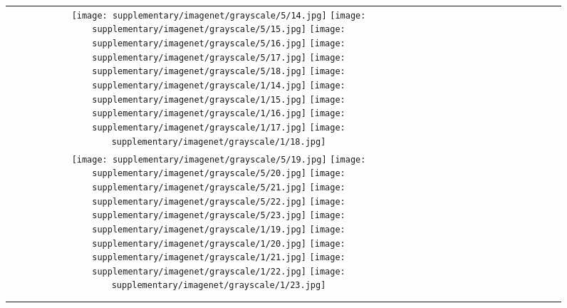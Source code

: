 \begin{figure*}[tb!]
{\begin{tabular}{c c c c c c c c c c c c c c }
\tabularnewline
  \texttt{[image: supplementary/imagenet/grayscale/5/14.jpg]}
  \texttt{[image: supplementary/imagenet/grayscale/5/15.jpg]}
  \texttt{[image: supplementary/imagenet/grayscale/5/16.jpg]}
  \texttt{[image: supplementary/imagenet/grayscale/5/17.jpg]}
  \texttt{[image: supplementary/imagenet/grayscale/5/18.jpg]}
    \hspace{5mm}
  \texttt{[image: supplementary/imagenet/grayscale/1/14.jpg]}
  \texttt{[image: supplementary/imagenet/grayscale/1/15.jpg]}
  \texttt{[image: supplementary/imagenet/grayscale/1/16.jpg]}
  \texttt{[image: supplementary/imagenet/grayscale/1/17.jpg]}
  \texttt{[image: supplementary/imagenet/grayscale/1/18.jpg]}

\tabularnewline
  \texttt{[image: supplementary/imagenet/grayscale/5/19.jpg]}
  \texttt{[image: supplementary/imagenet/grayscale/5/20.jpg]}
  \texttt{[image: supplementary/imagenet/grayscale/5/21.jpg]}
  \texttt{[image: supplementary/imagenet/grayscale/5/22.jpg]}
  \texttt{[image: supplementary/imagenet/grayscale/5/23.jpg]}
    \hspace{5mm}
  \texttt{[image: supplementary/imagenet/grayscale/1/19.jpg]}
  \texttt{[image: supplementary/imagenet/grayscale/1/20.jpg]}
  \texttt{[image: supplementary/imagenet/grayscale/1/21.jpg]}
  \texttt{[image: supplementary/imagenet/grayscale/1/22.jpg]}
  \texttt{[image: supplementary/imagenet/grayscale/1/23.jpg]}
    \tabularnewline

 \hspace{0.5mm}
  \tabularnewline
\vspace{2mm}
\vspace{-2\baselineskip}
\end{tabular}}
\vspace{-0.8cm}
\hspace{20pt}\label{fig:sup1b}
\vspace{-8mm}
\end{figure*}%